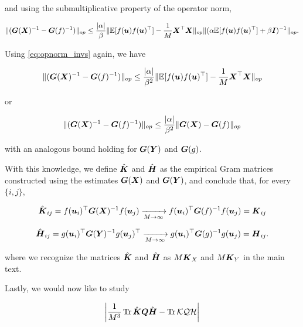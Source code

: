 and using the submultiplicative property of the operator norm,

\begin{equation*}
      \|  (\boldsymbol{G}(\boldsymbol{X})^{-1} - \boldsymbol{G}(f)^{-1})\|_{op} \le \frac{|\alpha|}{\beta} \|  \mathbb{E}[f(\boldsymbol{u}) f(\boldsymbol{u})^\top] - \frac{1}{M} \boldsymbol{X}^\top \boldsymbol{X} \|_{op} \| (\alpha \mathbb{E}[f(\boldsymbol{u}) f(\boldsymbol{u})^\top] + \beta \boldsymbol{I})^{-1}  \|_{op}. 
\end{equation*}

Using \cref{eq:opnorm_invs} again, we have 

\begin{equation}
    \|  (\boldsymbol{G}(\boldsymbol{X})^{-1} - \boldsymbol{G}(f)^{-1})\|_{op} \le \frac{|\alpha|}{\beta^2} \|  \mathbb{E}[f(\boldsymbol{u}) f(\boldsymbol{u})^\top] - \frac{1}{M} \boldsymbol{X}^\top \boldsymbol{X} \|_{op}
\end{equation}

or 

\begin{equation}\label{eq:inv-op-norm}
    \|  (\boldsymbol{G}(\boldsymbol{X})^{-1} - \boldsymbol{G}(f)^{-1})\|_{op} \le \frac{|\alpha|}{\beta^2} \|  \boldsymbol{G}(\boldsymbol{X}) - \boldsymbol{G}(f) \|_{op}
\end{equation}

with an analogous bound holding for $\boldsymbol{G}(\boldsymbol{Y})$ and $\boldsymbol{G}(g)$.


With this knowledge, we define $\hat{\boldsymbol{K}}$ and $\hat{\boldsymbol{H}}$ as the empirical Gram matrices constructed using the estimates $\boldsymbol{G}(\boldsymbol{X})$ and $\boldsymbol{G}(\boldsymbol{Y})$, and conclude that, for every $\{i, j \}$,

\begin{equation}
    \hat{\boldsymbol{K}}_{ij} = f(\boldsymbol{u}_i)^\top \boldsymbol{G}(\boldsymbol{X})^{-1} f(\boldsymbol{u}_j) \xrightarrow[M\rightarrow \infty]{} f(\boldsymbol{u}_i)^\top \boldsymbol{G}(f)^{-1} f(\boldsymbol{u}_j) = \boldsymbol{K}_{ij}
\end{equation}

\begin{equation}
    \hat{\boldsymbol{H}}_{ij} = g(\boldsymbol{u}_i)^\top \boldsymbol{G}(\boldsymbol{Y})^{-1} g(\boldsymbol{u}_j)^\top \xrightarrow[M\rightarrow \infty]{} g(\boldsymbol{u}_i)^\top \boldsymbol{G}(g)^{-1} g(\boldsymbol{u}_j) = \boldsymbol{H}_{ij}. 
\end{equation}

where we recognize the matrices $\hat{\boldsymbol{K}}$ and $\hat{\boldsymbol{H}}$ as $M \boldsymbol{K}_{X}$ and $M \boldsymbol{K}_Y$ in the main text. 


Lastly, we would now like to study 

\begin{equation}
    \bigg{|}\frac{1}{M^3} \operatorname*{Tr} \hat{\boldsymbol{K}} \boldsymbol{Q} \hat{\boldsymbol{H}} - \operatorname*{Tr} \mathcal{KQH} \bigg{|} 
\end{equation}

